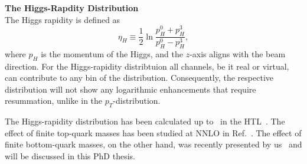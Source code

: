 \textbf{The Higgs-Rapdity Distribution} \\
The Higgs rapidity is defined as
\begin{equation}
\eta_H \equiv \frac{1}{2} \ln \frac{p^0_H + p^3_H}{p^0_H - p^3_H},
\end{equation}
where $p_H$ is the momentum of the Higgs, and the $z$-axis aligns with the beam direction. For the Higgs-rapidity distribtuion all channels, be it real or virtual, can contribute to any bin of the distribution. Consequently, the respective distribution will not show any logarithmic enhancements that require resummation, unlike in the $p_T$-distribution.

The Higgs-rapidity distribution has been calculated up to \NNNLO\ in the \acs{HTL}~\cite{Dulat:2018bfe, Dulat:2017prg}. The effect of finite top-quark masses has been studied at \acs{NNLO} in Ref.~\cite{Niggetiedt:2024nmp}. The effect of finite bottom-quark masses, on the other hand, was recently presented by us~\cite{Czakon:2024ywb} and will be discussed in this PhD thesis.

